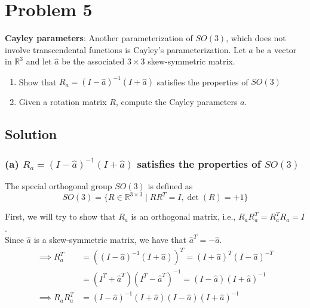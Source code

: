 \section*{Problem 5}

\textbf{Cayley parameters}:
Another parameterization of \(S O(3)\), which does not involve transcendental functions is Cayley's parameterization.
Let \(a\) be a vector in \(\mathbb{R}^{3}\) and let \(\hat{a}\) be the associated \(3 \times 3\) skew-symmetric matrix.
\begin{enumerate}[label= (\alph*)]
    \item Show that \(R_{a}=(I-\hat{a})^{-1}(I+\hat{a})\) satisfies the properties of \(S O(3)\)
    \item Given a rotation matrix \(R\), compute the Cayley parameters \(a\).
\end{enumerate}

\subsection*{Solution}

\subsubsection*{(a) \( R_{a}=(I-\hat{a})^{-1}(I+\hat{a}) \) satisfies the properties of \( SO(3) \)}

The special orthogonal group \( SO(3) \) is defined as
\[
    SO(3) = \{ R \in \mathbb{R}^{3 \times 3} \mid R R^{T} = I, \det(R) = +1 \}
\]

First, we will try to show that \( R_{a} \) is an orthogonal matrix, i.e., \( R_{a} R_{a}^{T} = R_{a}^{T} R_{a} = I \).\\
Since \( \hat a \) is a skew-symmetric matrix, we have that \( \hat a^{T} = -\hat a \).
\begin{align*}
    \implies
    R_a^T
     & =
    \left( (I - \hat{a})^{-1} (I + \hat{a}) \right)^T
    =
    (I + \hat{a})^T (I - \hat{a})^{-T}
    \\ & =
    (I^T + \hat{a}^T) (I^T - \hat{a}^T)^{-1}
    =
    (I - \hat{a}) (I + \hat{a})^{-1}
    \\
    \implies
    R_a R_a^T
     & =
    (I - \hat{a})^{-1} (I + \hat{a}) (I - \hat{a}) (I + \hat{a})^{-1}
\end{align*}

